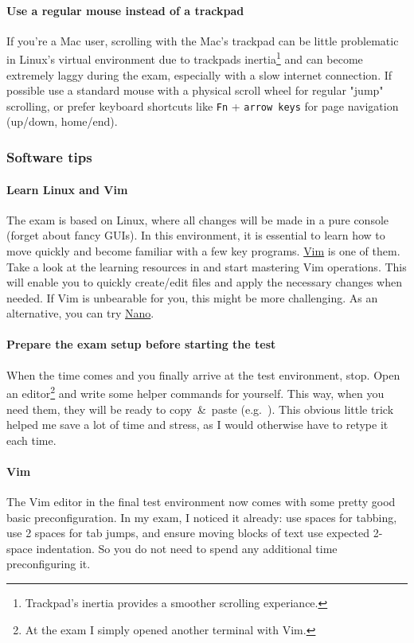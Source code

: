 \paragraph{Use a regular mouse instead of a trackpad} If you're a Mac user, scrolling with the Mac's trackpad can be little problematic in Linux's virtual environment due to trackpads inertia\footnote{Trackpad's inertia provides a smoother scrolling experiance.} and can become extremely laggy during the exam, especially with a slow internet connection. If possible use a standard mouse with a physical scroll wheel for regular "jump" scrolling, or prefer keyboard shortcuts like \texttt{Fn} + \texttt{arrow keys} for page navigation (up/down, home/end).

\subsubsection{Software tips}

\paragraph{Learn Linux and Vim}  
The exam is based on Linux, where all changes will be made in a pure console (forget about fancy GUIs). In this environment, it is essential to learn how to move quickly and become familiar with a few key programs. \href{https://www.vim.org/}{Vim} is one of them\cite{vim-org}.  
Take a look at the learning resources in  and start mastering Vim operations. This will enable you to quickly create/edit files and apply the necessary changes when needed.  
If Vim is unbearable for you, this might be more challenging. As an alternative, you can try \href{https://www.nano-editor.org}{Nano}\cite{nano-org}.

\paragraph{Prepare the exam setup before starting the test} When the time comes and you finally arrive at the test environment, stop. Open an editor\footnote{At the exam I simply opened another terminal with Vim.} and write some helper commands for yourself. This way, when you need them, they will be ready to copy~\&~paste (e.g.\ ). This obvious little trick helped me save a lot of time and stress, as I would otherwise have to retype it each time.

\paragraph{Vim} The Vim editor in the final test environment now comes with some pretty good basic preconfiguration. In my exam, I noticed it already: use spaces for tabbing, use 2 spaces for tab jumps, and ensure moving blocks of text use expected 2-space indentation. So you do not need to spend any additional time preconfiguring it.

